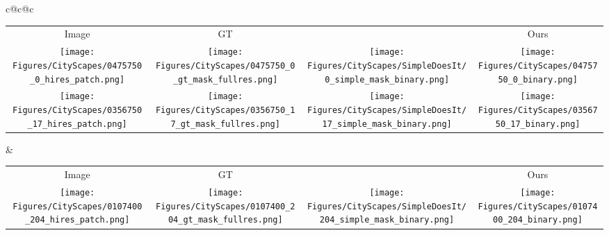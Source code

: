 \documentclass[runningheads]{llncs}
\begin{document}
\scriptsize
\centering
\begin{tabular}{ c@{\hspace{0.005\textwidth}}c@{\hspace{0.005\textwidth}}c}

\begin{tabular}{ c@{\hspace{0.005\textwidth}}c@{\hspace{0.005\textwidth}}c@{\hspace{0.005\textwidth}}c}
    Image & GT & \cite{khoreva2016simple} & Ours \\
    \texttt{[image: Figures/CityScapes/0475750\_0\_hires\_patch.png]} &
    \texttt{[image: Figures/CityScapes/0475750\_0\_gt\_mask\_fullres.png]} &
    \texttt{[image: Figures/CityScapes/SimpleDoesIt/0\_simple\_mask\_binary.png]} &
    \texttt{[image: Figures/CityScapes/0475750\_0\_binary.png]} \\ [-0.25ex]
    
    \texttt{[image: Figures/CityScapes/0356750\_17\_hires\_patch.png]} &
    \texttt{[image: Figures/CityScapes/0356750\_17\_gt\_mask\_fullres.png]} &
    \texttt{[image: Figures/CityScapes/SimpleDoesIt/17\_simple\_mask\_binary.png]} &
    \texttt{[image: Figures/CityScapes/0356750\_17\_binary.png]} \\[-0.25ex]
\end{tabular} & 
\begin{tabular}{ c@{\hspace{0.005\textwidth}}c@{\hspace{0.005\textwidth}}c@{\hspace{0.005\textwidth}}c}         Image & GT & \cite{khoreva2016simple} & Ours \\
    \texttt{[image: Figures/CityScapes/0107400\_204\_hires\_patch.png]} &
    \texttt{[image: Figures/CityScapes/0107400\_204\_gt\_mask\_fullres.png]} &
    \texttt{[image: Figures/CityScapes/SimpleDoesIt/204\_simple\_mask\_binary.png]} &
    \texttt{[image: Figures/CityScapes/0107400\_204\_binary.png]}  \\ [-0.25ex]


\end{tabular}
\end{tabular}
\end{document}
